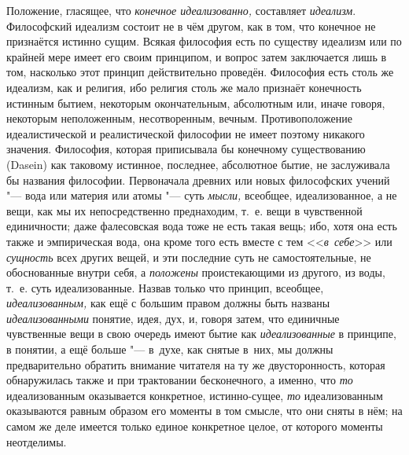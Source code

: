 Положение, гласящее, что {\em конечное идеализованно,}
составляет {\em идеализм}. Философский идеализм состоит
не в чём другом, как в том, что конечное не признаётся истинно сущим.
Всякая философия есть по существу идеализм или по крайней мере имеет его
своим принципом, и вопрос затем заключается лишь в том, насколько этот
принцип действительно проведён. Философия есть столь же идеализм, как и
религия, ибо религия столь же мало признаёт конечность истинным бытием,
некоторым окончательным, абсолютным или, иначе говоря, некоторым
неположенным, несотворенным, вечным. Противоположение идеалистической и
реалистической философии не имеет поэтому никакого значения. Философия,
которая приписывала бы конечному существованию (Dasein) как таковому
истинное, последнее, абсолютное бытие, не заслуживала бы названия
философии. Первоначала древних или новых философских учений "--- вода или
материя или атомы "--- суть {\em мысли,} всеобщее,
идеализованное, а не вещи, как мы их непосредственно преднаходим, т.~е.
вещи в чувственной единичности; даже фалесовская вода тоже не есть такая
вещь; ибо, хотя она есть также и эмпирическая вода, она кроме того есть
вместе с тем <<{\em в~себе}>> или
{\em сущность} всех других вещей, и эти последние суть
не самостоятельные, не обоснованные внутри себя, а
{\em положены} проистекающими из другого, из
воды, т.~е. суть идеализованные. Назвав только что принцип, всеобщее,
{\em идеализованным,} как ещё с большим правом должны
быть названы {\em идеализованными} понятие, идея, дух,
и, говоря затем, что единичные чувственные вещи в свою очередь имеют бытие
как {\em идеализованные} в принципе, в понятии, а ещё
больше "--- в~духе, как снятые в~них, мы должны предварительно обратить
внимание читателя на ту же двусторонность, которая обнаружилась также и при
трактовании бесконечного, а именно, что {\em то}
идеализованным оказывается конкретное, истинно-сущее,
{\em то} идеализованным оказываются равным образом его
моменты в том смысле, что они сняты в нём; на самом же деле имеется только
единое конкретное целое, от которого моменты неотделимы.


